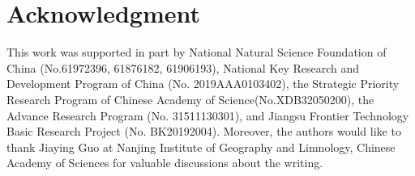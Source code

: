 \documentclass[journal,final]{IEEEtran}
\begin{document}
\section*{Acknowledgment}
This work was supported in part by National Natural Science Foundation of China (No.61972396, 61876182, 61906193), National Key Research and Development Program of China (No. 2019AAA0103402),  the Strategic Priority Research Program of Chinese Academy of Science(No.XDB32050200), the Advance Research Program (No. 31511130301), and Jiangsu Frontier Technology Basic Research Project (No. BK20192004). Moreover, the authors would like to thank Jiaying Guo at Nanjing Institute of Geography and Limnology, Chinese Academy of Sciences for valuable discussions about the writing.


\ifCLASSOPTIONcaptionsoff
  \newpage
\fi









\end{document}
